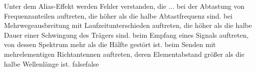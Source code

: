     {Unter dem Alias-Effekt werden Fehler verstanden, die ...}
    {bei der Abtastung von Frequenzanteilen auftreten, die höher als die halbe Abtastfrequenz sind.}
    {bei Mehrwegeausbreitung mit Laufzeitunterschieden auftreten, die höher als die halbe Dauer einer Schwingung des Trägers sind.}
    {beim Empfang eines Signals auftreten, von dessen Spektrum mehr als die Hälfte gestört ist.}
    {beim Senden mit mehrelementigen Richtantennen auftreten, deren Elementabstand größer als die halbe Wellenlänge ist.}
    {false}{false}